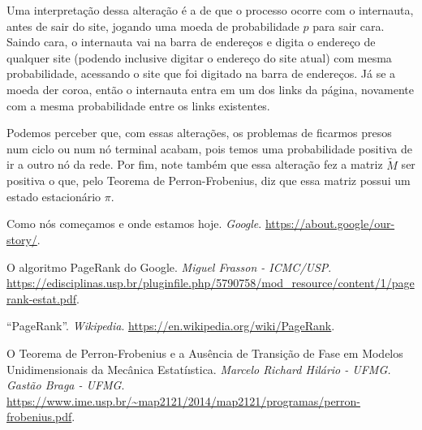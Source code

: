 \documentclass{article}
\begin{document}
Uma interpretação dessa alteração é a de que o processo ocorre com o internauta, antes de sair do site, jogando uma moeda de probabilidade $p$ para sair cara. Saindo cara, o internauta vai na barra de endereços e digita o endereço de qualquer site (podendo inclusive digitar o endereço do site atual) com mesma probabilidade, acessando o site que foi digitado na barra de endereços. Já se a moeda der coroa, então o internauta entra em um dos links da página, novamente com a mesma probabilidade entre os links existentes.

Podemos perceber que, com essas alterações, os problemas de ficarmos presos num ciclo ou num nó terminal acabam, pois temos uma probabilidade positiva de ir a outro nó da rede. Por fim, note também que essa alteração fez a matriz $\tilde{M}$ ser positiva o que, pelo Teorema de Perron-Frobenius, diz que essa matriz possui um estado estacionário $\pi$.







\newpage
\begin{thebibliography}{9}

 Como nós começamos e onde estamos hoje. \textit{Google}. \url{https://about.google/our-story/}.

 O algoritmo PageRank do Google. \textit{Miguel Frasson - ICMC/USP}. \url{https://edisciplinas.usp.br/pluginfile.php/5790758/mod_resource/content/1/pagerank-estat.pdf}.

 ``PageRank''. \textit{Wikipedia}. \url{https://en.wikipedia.org/wiki/PageRank}.

 O Teorema de Perron-Frobenius e a Ausência de Transição de Fase em Modelos Unidimensionais da Mecânica Estatíıstica. \textit{Marcelo Richard Hilário - UFMG. Gastão Braga - UFMG}. \url{https://www.ime.usp.br/~map2121/2014/map2121/programas/perron-frobenius.pdf}.

\end{thebibliography}
\end{document}
